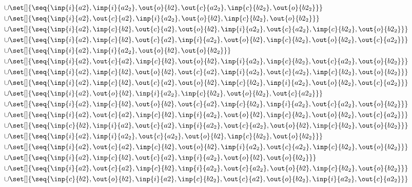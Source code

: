 \begin{align*}
\cup&\set[]{\seq{\inp{i}{a2},\inp{i}{a2_2},\out{o}{b2},\out{c}{a2_2},\inp{c}{b2_2},\out{o}{b2_2}}}\\
\cup&\set[]{\seq{\inp{i}{a2},\out{c}{a2},\inp{i}{a2_2},\out{o}{b2},\inp{c}{b2_2},\out{o}{b2_2}}}\\
\cup&\set[]{\seq{\inp{i}{a2},\inp{c}{b2},\out{c}{a2},\out{o}{b2},\inp{i}{a2_2},\out{c}{a2_2},\inp{c}{b2_2},\out{o}{b2_2}}}\\
\cup&\set[]{\seq{\inp{i}{a2},\inp{c}{b2},\out{c}{a2},\inp{i}{a2_2},\out{o}{b2},\inp{c}{b2_2},\out{o}{b2_2},\out{c}{a2_2}}}\\
\cup&\set[]{\seq{\inp{i}{a2},\inp{i}{a2_2},\out{o}{b2},\out{o}{b2_2}}}\\
\cup&\set[]{\seq{\inp{i}{a2},\out{c}{a2},\inp{c}{b2},\out{o}{b2},\inp{i}{a2_2},\inp{c}{b2_2},\out{c}{a2_2},\out{o}{b2_2}}}\\
\cup&\set[]{\seq{\inp{i}{a2},\inp{c}{b2},\out{o}{b2},\out{c}{a2},\inp{i}{a2_2},\out{c}{a2_2},\inp{c}{b2_2},\out{o}{b2_2}}}\\
\cup&\set[]{\seq{\inp{i}{a2},\inp{c}{b2},\out{c}{a2},\out{o}{b2},\inp{c}{b2_2},\inp{i}{a2_2},\out{o}{b2_2},\out{c}{a2_2}}}\\
\cup&\set[]{\seq{\inp{i}{a2},\out{o}{b2},\inp{i}{a2_2},\inp{c}{b2_2},\out{o}{b2_2},\out{c}{a2_2}}}\\
\cup&\set[]{\seq{\inp{i}{a2},\inp{c}{b2},\out{o}{b2},\out{c}{a2},\inp{c}{b2_2},\inp{i}{a2_2},\out{c}{a2_2},\out{o}{b2_2}}}\\
\cup&\set[]{\seq{\inp{i}{a2},\out{c}{a2},\inp{c}{b2},\inp{i}{a2_2},\out{o}{b2},\inp{c}{b2_2},\out{o}{b2_2},\out{c}{a2_2}}}\\
\cup&\set[]{\seq{\inp{c}{b2},\inp{i}{a2},\out{c}{a2},\inp{i}{a2_2},\out{c}{a2_2},\out{o}{b2},\inp{c}{b2_2},\out{o}{b2_2}}}\\
\cup&\set[]{\seq{\inp{i}{a2},\inp{i}{a2_2},\out{c}{a2_2},\out{o}{b2},\inp{c}{b2_2},\out{o}{b2_2}}}\\
\cup&\set[]{\seq{\inp{i}{a2},\out{c}{a2},\inp{c}{b2},\out{o}{b2},\inp{i}{a2_2},\out{c}{a2_2},\inp{c}{b2_2},\out{o}{b2_2}}}\\
\cup&\set[]{\seq{\inp{i}{a2},\inp{c}{b2},\out{c}{a2},\inp{i}{a2_2},\out{o}{b2},\out{o}{b2_2}}}\\
\cup&\set[]{\seq{\inp{i}{a2},\out{c}{a2},\inp{c}{b2},\inp{i}{a2_2},\out{c}{a2_2},\out{o}{b2},\inp{c}{b2_2},\out{o}{b2_2}}}\\
\cup&\set[]{\seq{\inp{c}{b2},\out{o}{b2},\inp{i}{a2},\inp{c}{b2_2},\out{c}{a2},\out{o}{b2_2},\inp{i}{a2_2},\out{c}{a2_2}}}\\

\end{align*}
